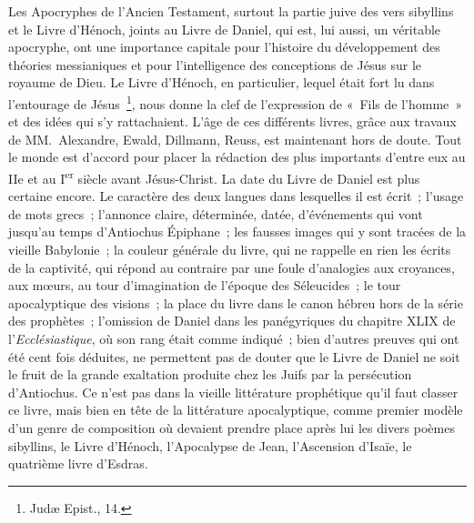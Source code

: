\documentclass[french,twoside]{book} %
\begin{document}
Les Apocryphes de l’Ancien Testament, surtout la partie juive des vers sibyllins et le Livre d’Hénoch, joints au Livre de Daniel, qui est, lui aussi, un véritable apocryphe, ont une importance capitale pour l’histoire du développement des théories messianiques et pour l’intelligence des conceptions de Jésus sur le royaume de Dieu. Le Livre d’Hénoch, en particulier, lequel était fort lu dans l’entourage de Jésus \footnote{Judæ Epist., 14.}, nous donne la clef de l’expression de « Fils de l’homme » et des idées qui s’y rattachaient. L’âge de ces différents livres, grâce aux travaux de MM. Alexandre, Ewald, Dillmann, Reuss, est maintenant hors de doute. Tout le monde est d’accord pour placer la rédaction des plus importants d’entre eux au IIe et au I\textsuperscript{er} siècle avant Jésus-Christ. La date du Livre de Daniel est plus certaine encore. Le caractère des deux langues dans lesquelles il est écrit ; l’usage de mots grecs ; l’annonce claire, déterminée, datée, d’événements qui vont jusqu’au temps d’Antiochus Épiphane ; les fausses images qui y sont tracées de la vieille Babylonie ; la couleur générale du livre, qui ne rappelle en rien les écrits de la captivité, qui répond au contraire par une foule d’analogies aux croyances, aux mœurs, au tour d’imagination de l’époque des Séleucides ; le tour apocalyptique des visions ; la place du livre dans le canon hébreu hors de la série des prophètes ; l’omission de Daniel dans les panégyriques du chapitre XLIX de l’{\itshape Ecclésiastique}, où son rang était comme indiqué ; bien d’autres preuves qui ont été cent fois déduites, ne permettent pas de douter que le Livre de Daniel ne soit le fruit de la grande exaltation produite chez les Juifs par la persécution d’Antiochus. Ce n’est pas dans la vieille littérature prophétique qu’il faut classer ce livre, mais bien en tête de la littérature apocalyptique, comme premier modèle d’un genre de composition où devaient prendre place après lui les divers poèmes sibyllins, le Livre d’Hénoch, l’Apocalypse de Jean, l’Ascension d’Isaïe, le quatrième livre d’Esdras.\par
\end{document}
